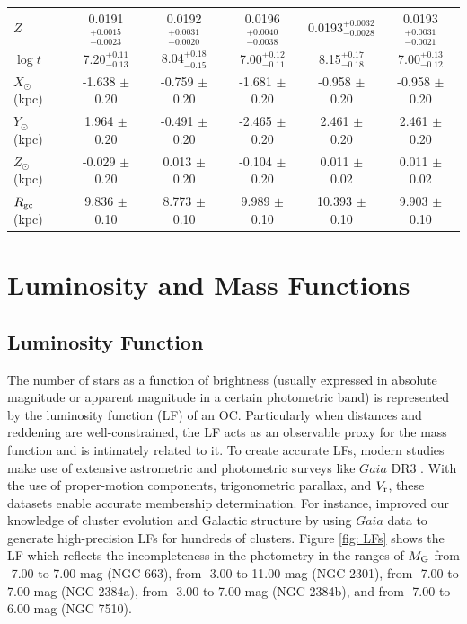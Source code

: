\documentclass[referee]{raa}            %
\begin{document}
\begin{table}[t]
{\begin{tabular}{lccccc}
$Z$ 
& 0.0191$^{+0.0015}_{-0.0023}$ 
& 0.0192$^{+0.0031}_{-0.0020}$ 
& 0.0196$^{+0.0040}_{-0.0038}$ 
& 0.0193$^{+0.0032}_{-0.0028}$ 
& 0.0193$^{+0.0031}_{-0.0021}$ \\

$\log t$ 
& 7.20$^{+0.11}_{-0.13}$
& 8.04$^{+0.18}_{-0.15}$ 
& 7.00$^{+0.12}_{-0.11}$ 
& 8.15$^{+0.17}_{-0.18}$ 
& 7.00$^{+0.13}_{-0.12}$ \\  

$X_{\odot}$ (kpc) & -1.638 $\pm$ 0.20 & -0.759 $\pm$ 0.20 & -1.681 $\pm$ 0.20 & -0.958 $\pm$ 0.20 & -0.958 $\pm$ 0.20  \\ 

$Y_{\odot}$ (kpc) & 1.964 $\pm$ 0.20   & -0.491 $\pm$ 0.20 & -2.465 $\pm$ 0.20 & 2.461 $\pm$ 0.20 & 2.461 $\pm$ 0.20   \\

$Z_{\odot}$ (kpc) & -0.029 $\pm$ 0.20  & 0.013 $\pm$ 0.20 & -0.104 $\pm$ 0.20 & 0.011 $\pm$ 0.02 & 0.011 $\pm$ 0.02 \\

$R_{\rm gc}$(kpc) & 9.836 $\pm$ 0.10 & 8.773 $\pm$ 0.10 & 9.989  $\pm$ 0.10  & 10.393 $\pm$ 0.10 & 9.903 $\pm$ 0.10\\
 \hline    
\end{tabular}}
\end{table}

\section{Luminosity and Mass Functions}
\subsection{Luminosity Function}
\label{sec:LF and MF}

The number of stars as a function of brightness (usually expressed in absolute magnitude or apparent magnitude in a certain photometric band) is represented by the luminosity function (LF) of an OC. Particularly when distances and reddening are well-constrained, the LF acts as an observable proxy for the mass function and is intimately related to it. To create accurate LFs, modern studies make use of extensive astrometric and photometric surveys like $Gaia$ DR3 \citep[e.g.][]{GaiaDR3}. With the use of proper-motion components, trigonometric parallax, and $V_{\rm r}$, these datasets enable accurate membership determination. For instance, \citet{Cantat_2020} improved our knowledge of cluster evolution and Galactic structure by using $Gaia$ data to generate high-precision LFs for hundreds of clusters. Figure \ref{fig: LFs} shows the LF which reflects the incompleteness in the photometry in the ranges of $M_{\rm G}$ from -7.00 to 7.00 mag (NGC 663), from -3.00 to 11.00 mag (NGC 2301), from -7.00 to 7.00 mag (NGC 2384a), from -3.00 to 7.00 mag (NGC 2384b), and from -7.00 to 6.00 mag (NGC 7510).
\end{document}
